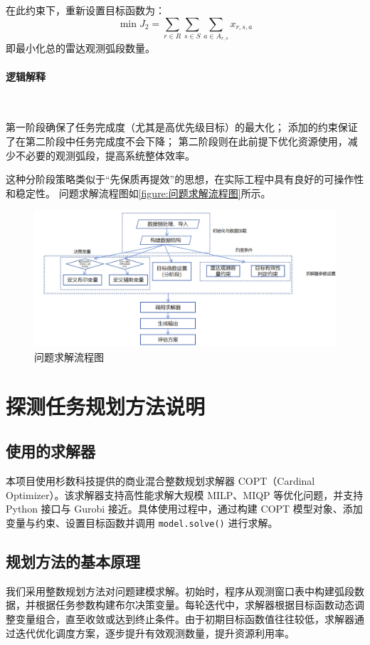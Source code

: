 \documentclass[openany,12pt,UTF8]{ctexart}
\begin{document}
在此约束下，重新设置目标函数为：
$$
    \min J_2 = \sum_{r \in R}\sum_{s \in S}\sum_{a \in A_{r,s}} x_{r,s,a}
$$
即最小化总的雷达观测弧段数量。

\paragraph{逻辑解释}\

第一阶段确保了任务完成度（尤其是高优先级目标）的最大化；
添加的约束保证了在第二阶段中任务完成度不会下降；
第二阶段则在此前提下优化资源使用，减少不必要的观测弧段，提高系统整体效率。

这种分阶段策略类似于“先保质再提效”的思想，在实际工程中具有良好的可操作性和稳定性。
问题求解流程图如\autoref{figure:问题求解流程图}所示。
\begin{figure}[h]\centering
    \includegraphics[width=\columnwidth]{figures/问题求解流程图.png}
    \caption{问题求解流程图}
    \label{figure:问题求解流程图}
\end{figure}

\section{探测任务规划方法说明}
\subsection{使用的求解器}
本项目使用杉数科技提供的商业混合整数规划求解器 COPT（Cardinal Optimizer）。该求解器支持高性能求解大规模 MILP、MIQP 等优化问题，并支持 Python 接口与 Gurobi 接近。具体使用过程中，通过构建 COPT 模型对象、添加变量与约束、设置目标函数并调用 \texttt{model.solve()} 进行求解。

\subsection{规划方法的基本原理}
我们采用整数规划方法对问题建模求解。初始时，程序从观测窗口表中构建弧段数据，并根据任务参数构建布尔决策变量。每轮迭代中，求解器根据目标函数动态调整变量组合，直至收敛或达到终止条件。由于初期目标函数值往往较低，求解器通过迭代优化调度方案，逐步提升有效观测数量，提升资源利用率。
\end{document}
